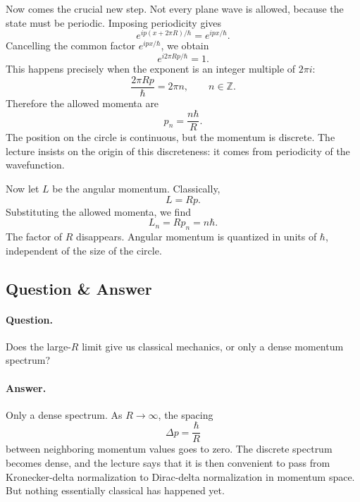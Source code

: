 Now comes the crucial new step. Not every plane wave is allowed, because the state must be periodic. Imposing periodicity gives
\begin{equation}
e^{ip(x+2\pi R)/\hbar}=e^{ipx/\hbar}.
\end{equation}
Cancelling the common factor \(e^{ipx/\hbar}\), we obtain
\begin{equation}
e^{i2\pi Rp/\hbar}=1.
\end{equation}
This happens precisely when the exponent is an integer multiple of \(2\pi i\):
\begin{equation}
\frac{2\pi Rp}{\hbar}=2\pi n,
\qquad n\in\mathbb Z.
\end{equation}
Therefore the allowed momenta are
\begin{equation}
p_n=\frac{n\hbar}{R}.
\end{equation}
The position on the circle is continuous, but the momentum is discrete. The lecture insists on the origin of this discreteness: it comes from periodicity of the wavefunction.

Now let \(L\) be the angular momentum. Classically,
\begin{equation}
L=Rp.
\end{equation}
Substituting the allowed momenta, we find
\begin{equation}
L_n=Rp_n=n\hbar.
\end{equation}
The factor of \(R\) disappears. Angular momentum is quantized in units of \(\hbar\), independent of the size of the circle.

\subsection{Question \& Answer}

\paragraph{Question.} Does the large-\(R\) limit give us classical mechanics, or only a dense momentum spectrum?

\paragraph{Answer.} Only a dense spectrum. As \(R\to\infty\), the spacing
\[
\Delta p=\frac{\hbar}{R}
\]
between neighboring momentum values goes to zero. The discrete spectrum becomes dense, and the lecture says that it is then convenient to pass from Kronecker-delta normalization to Dirac-delta normalization in momentum space. But nothing essentially classical has happened yet.

